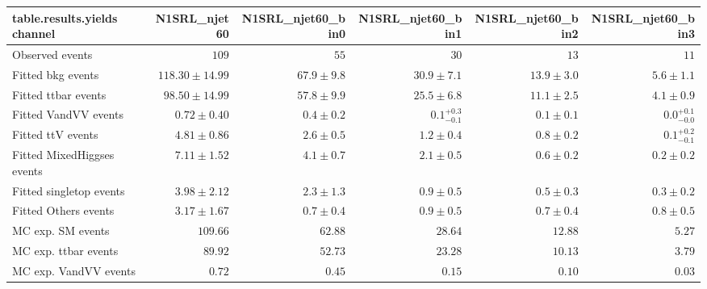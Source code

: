 

\begin{table}
\centering
\small
\begin{tabular*}{\textwidth}{@{\extracolsep{\fill}}lrrrrr}
\toprule
\textbf{table.results.yields channel}           & N1SRL\_njet60            & N1SRL\_njet60\_bin0            & N1SRL\_njet60\_bin1            & N1SRL\_njet60\_bin2            & N1SRL\_njet60\_bin3              \\
\midrule
Observed events          & $109$              & $55$              & $30$              & $13$              & $11$                    \\
\midrule
Fitted bkg events         & $118.30 \pm 14.99$          & $67.9 \pm 9.8$          & $30.9 \pm 7.1$          & $13.9 \pm 3.0$          & $5.6 \pm 1.1$              \\
\midrule
        Fitted ttbar events         & $98.50 \pm 14.99$          & $57.8 \pm 9.9$          & $25.5 \pm 6.8$          & $11.1 \pm 2.5$          & $4.1 \pm 0.9$              \\
        Fitted VandVV events         & $0.72 \pm 0.40$          & $0.4 \pm 0.2$          & $0.1_{-0.1}^{+0.3}$          & $0.1 \pm 0.1$          & $0.0_{-0.0}^{+0.1}$              \\
        Fitted ttV events         & $4.81 \pm 0.86$          & $2.6 \pm 0.5$          & $1.2 \pm 0.4$          & $0.8 \pm 0.2$          & $0.1_{-0.1}^{+0.2}$              \\
        Fitted MixedHiggses events         & $7.11 \pm 1.52$          & $4.1 \pm 0.7$          & $2.1 \pm 0.5$          & $0.6 \pm 0.2$          & $0.2 \pm 0.2$              \\
        Fitted singletop events         & $3.98 \pm 2.12$          & $2.3 \pm 1.3$          & $0.9 \pm 0.5$          & $0.5 \pm 0.3$          & $0.3 \pm 0.2$              \\
        Fitted Others events         & $3.17 \pm 1.67$          & $0.7 \pm 0.4$          & $0.9 \pm 0.5$          & $0.7 \pm 0.4$          & $0.8 \pm 0.5$              \\
 \midrule
MC exp. SM events              & $109.66$          & $62.88$          & $28.64$          & $12.88$          & $5.27$              \\
\midrule
        MC exp. ttbar events         & $89.92$          & $52.73$          & $23.28$          & $10.13$          & $3.79$              \\
        MC exp. VandVV events         & $0.72$          & $0.45$          & $0.15$          & $0.10$          & $0.03$              \\

\end{tabular*}
\end{table}

